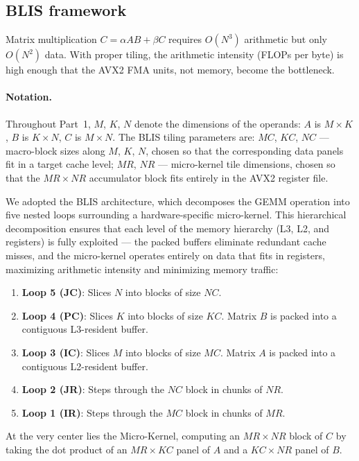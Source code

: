 \documentclass[11pt,a4paper]{article}
\begin{document}
\subsection{BLIS framework}

Matrix multiplication $C = \alpha A B + \beta C$ requires $O(N^3)$ arithmetic but only $O(N^2)$ data. With proper tiling, the arithmetic intensity (FLOPs per byte) is high enough that the AVX2 FMA units, not memory, become the bottleneck.

\paragraph{Notation.}
Throughout Part~1, $M$, $K$, $N$ denote the dimensions of the operands:
$A$ is $M\times K$, $B$ is $K\times N$, $C$ is $M\times N$.
The BLIS tiling parameters are:
$MC$, $KC$, $NC$ — macro-block sizes along $M$, $K$, $N$, chosen so that
the corresponding data panels fit in a target cache level;
$MR$, $NR$ — micro-kernel tile dimensions, chosen so that the
$MR\times NR$ accumulator block fits entirely in the AVX2 register file.

We adopted the BLIS architecture, which decomposes the GEMM operation into five nested loops surrounding a hardware-specific micro-kernel. This hierarchical decomposition ensures that each level of the memory hierarchy (L3, L2, and registers) is fully exploited — the packed buffers eliminate redundant cache misses, and the micro-kernel operates entirely on data that fits in registers, maximizing arithmetic intensity and minimizing memory traffic:
\begin{enumerate}
    \item \textbf{Loop 5 (JC)}: Slices $N$ into blocks of size $NC$.
    \item \textbf{Loop 4 (PC)}: Slices $K$ into blocks of size $KC$. Matrix $B$ is packed into a contiguous L3-resident buffer.
    \item \textbf{Loop 3 (IC)}: Slices $M$ into blocks of size $MC$. Matrix $A$ is packed into a contiguous L2-resident buffer.
    \item \textbf{Loop 2 (JR)}: Steps through the $NC$ block in chunks of $NR$.
    \item \textbf{Loop 1 (IR)}: Steps through the $MC$ block in chunks of $MR$.
\end{enumerate}
At the very center lies the Micro-Kernel, computing an $MR \times NR$ block of $C$ by taking the dot product of an $MR \times KC$ panel of $A$ and a $KC \times NR$ panel of $B$.
\end{document}
